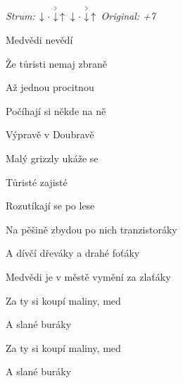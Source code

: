 \begin{song}


\textit{Strum:} $\Down\Miss\AccentDown\Up\ \Down\Miss\AccentDown\Up$ \quad
\textit{Original: +7}

\large


\Large

\bigskip

Medvědi nevědí \par
{}Že tůristi nemaj zbraně \par
{}Až jednou procitnou \par
{}Počíhají si někde na ně \par

\bigskip

Výpravě v Doubravě \par
{}Malý grizzly ukáže se \par
{}Tůristé zajisté \par
{}Rozutíkají se po lese \par

\bigskip

Na pěšině zbydou po nich tranzistoráky \par
A dívčí dřeváky a drahé foťáky \par
{}Medvědi je v městě vymění za zlaťáky \par
{}Za ty si koupí maliny, med  \par
A slané buráky  \par
{}Za ty si koupí maliny, med  \par
A slané buráky \par

\end{song}
